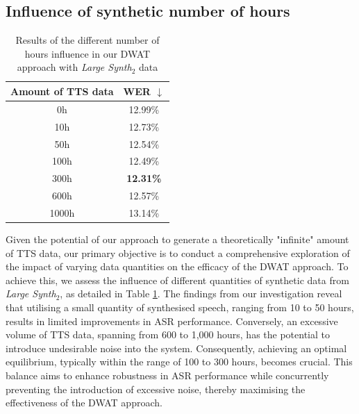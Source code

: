 \subsection{Influence of synthetic number of hours}
\begin{table}[t]
\centering
\begin{tabular}{cc}
\hline
 Amount of TTS data & WER $\downarrow$   \\ \hline
\multicolumn{1}{c}{0h} & 12.99\% \\ \hline
\multicolumn{1}{c}{10h}  &   12.73\%   \\ 
\multicolumn{1}{c}{50h}    & 12.54\%   \\ 
\multicolumn{1}{c}{100h} & 12.49\%  \\ 
\multicolumn{1}{c}{300h} & \textbf{12.31\%}  \\ 
\multicolumn{1}{c}{600h} & 12.57\%  \\ 
\multicolumn{1}{c}{1000h} & 13.14\%  \\ \hline

\end{tabular}

\caption{Results of the different number of hours influence in our DWAT approach with \textit{Large Synth$_2$} data}
\label{tab:hours}
\end{table}

Given the potential of our approach to generate a theoretically "infinite" amount of TTS data, our primary objective is to conduct a comprehensive exploration of the impact of varying data quantities on the efficacy of the DWAT approach. To achieve this, we assess the influence of different quantities of synthetic data from \textit{Large Synth$_2$}, as detailed in Table \ref{tab:hours}.
The findings from our investigation reveal that utilising a small quantity of synthesised speech, ranging from 10 to 50 hours, results in limited improvements in ASR performance. Conversely, an excessive volume of TTS data, spanning from 600 to 1,000 hours, has the potential to introduce undesirable noise into the system. Consequently, achieving an optimal equilibrium, typically within the range of 100 to 300 hours, becomes crucial. This balance aims to enhance robustness in ASR performance while concurrently preventing the introduction of excessive noise, thereby maximising the effectiveness of the DWAT approach.
